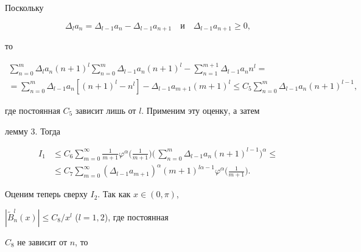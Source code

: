 Поскольку


$$


\Delta_l a_n=\Delta_{l-1}a_n-\Delta_{l-1}a_{n+1}\quad


\text{и}\quad \Delta_{l-1}a_{n+1}\ge 0,


$$


то


\begin{gather*}


\sum^m_{n=0}\Delta_l a_n(n+1)^l\sum^m_{n=0}


\Delta_{l-1}a_n(n+1)^l-\sum^{m+1}_{n=1}


\Delta_{l-1}a_n n^l= \\


=\sum^m_{n=0}\Delta_{l-1}a_n[(n+1)^l-n^l]


-\Delta_{l-1}a_{m+1}(m+1)^l\le C_5\sum^m_{n=0}


\Delta_{l-1}a_n(n+1)^{l-1},


\end{gather*}


где постоянная $C_5$ зависит лишь от $l$. Применим эту оценку, а затем


лемму 3. Тогда


\begin{align*}


I_1&\le C_6\sum^\infty_{m=0}\frac{1}{m+1}\varphi^\alpha


\biggl(\frac{1}{m+1} \biggr)\biggl(\,\sum^m_{n=0}


\Delta_{l-1}a_n(n+1)^{l-1}\biggr)^\alpha\le \\


&\le C_7\sum^\infty_{m=0}(\Delta_{l-1}a_{m+1})^\alpha


(m+1)^{l\alpha-1}\varphi^\alpha\biggl(\frac{1}{m+1} \biggr).


\end{align*}


Оценим теперь сверху $I_2$. Так как $x\in(0,\pi)$,


$|\widetilde B^l_n(x)|\le C_8/x^l$ ($l=1,2$), где постоянная


$C_8$ не зависит от $n$, то



